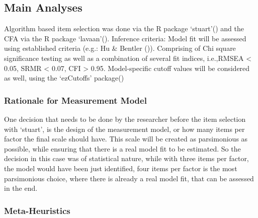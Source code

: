 \documentclass[
  12pt,
  a4paper,
  twoside]{article}
\begin{document}
\subsection{Main Analyses}\label{main-analyses}

Algorithm based item selection was done via the R package `stuart'() and the CFA via the R package `lavaan'(). Inference criteria: Model fit will be assessed using established criteria (e.g.: Hu \& Bentler ()). Comprising of Chi square significance testing as well as a combination of several fit indices, i.e.,RMSEA \textless{} 0.05, SRMR \textless{} 0.07, CFI \textgreater{} 0.95. Model-specific cutoff values will be considered as well, using the `ezCutoffs' package()

\subsubsection{Rationale for Measurement Model}\label{rationale-for-measurement-model}

One decision that needs to be done by the researcher before the item selection with `stuart', is the design of the measurement model, or how many items per factor the final scale should have.
This scale will be created as parsimonious as possible, while ensuring that there is a real model fit to be estimated. So the decision in this case was of statistical nature, while with three items per factor, the model would have been just identified, four items per factor is the most parsimonious choice, where there is already a real model fit, that can be assessed in the end.

\subsubsection{Meta-Heuristics}\label{meta-heuristics}
\end{document}

